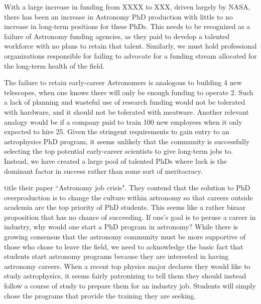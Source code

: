 \documentclass[preprint2]{aastex}
\begin{document}
With a large increase in funding from XXXX to XXX, driven largely by NASA, there has been an increase in Astronomy PhD production with little to no increase in long-term positions for these PhDs.  This needs to be recognized as a failure of Astronomy funding agencies, as they paid to develop a talented workforce with no plans to retain that talent. Similarly, we must hold professional organizations responsible for failing to advocate for a funding stream allocated for the long-term health of the field.  

The failure to retain early-career Astronomers is analogous to building 4 new telescopes, when one knows there will only be enough funding to operate 2.  Such a lack of planning and wasteful use of research funding would not be tolerated with hardware, and it should not be tolerated with meatware. Another relevant analogy would be if a company paid to train 100 new employees when it only expected to hire 25. Given the stringent requirements to gain entry to an astrophysics PhD program, it seems unlikely that the community is successfully selecting the top potential early-career scientists to give long-term jobs to. Instead, we have created a large pool of talented PhDs where luck is the dominant factor in success rather than some sort of meritocracy. 



\citet{Cooray15} title their paper ``Astronomy job crisis".  They contend that the solution to PhD overproduction is to change the culture within astronomy so that careers outside academia are the top priority of PhD students. This seems like a rather bizaar proposition that has no chance of succeeding. If one's goal is to peruse a career in industry, why would one start a PhD program in astronomy? While there is growing consensus that the astronomy community must be more supportive of those who chose to leave the field, we need to acknowledge the basic fact that students start astronomy programs because they are interested in having astronomy careers.  When a recent top physics major declares they would like to study astrophysics, it seems fairly patronizing to tell them they should instead follow a course of study to prepare them for an industry job. Students will simply chose the programs that provide the training they are seeking.
\end{document}
